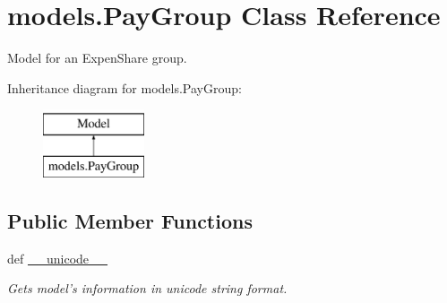 \hypertarget{classmodels_1_1_pay_group}{\section{models.\-Pay\-Group Class Reference}
\label{classmodels_1_1_pay_group}
}


Model for an Expen\-Share group.  


Inheritance diagram for models.\-Pay\-Group\-:\begin{figure}[H]
\begin{center}
\leavevmode
\includegraphics[height=2.000000cm]{classmodels_1_1_pay_group}
\end{center}
\end{figure}
\subsection*{Public Member Functions}
\begin{DoxyCompactItemize}
\item 
def \hyperlink{classmodels_1_1_pay_group_afbeee453535c8f38576fe70759a2e90b}{\-\_\-\-\_\-unicode\-\_\-\-\_\-}
\begin{DoxyCompactList}\small\item\em Gets model's information in unicode string format. \end{DoxyCompactList}\end{DoxyCompactItemize}
